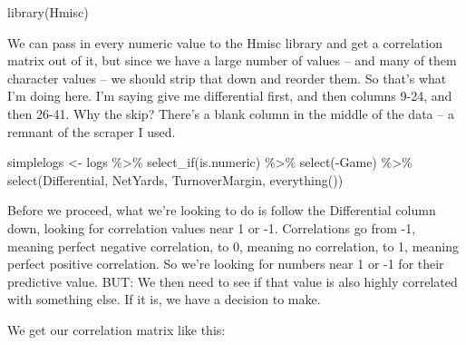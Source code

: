 \documentclass[
]{book}
\newenvironment{Shaded}{\begin{snugshade}}{\end{snugshade}}
\newcommand{\FunctionTok}[1]{\textcolor[rgb]{0.00,0.00,0.00}{#1}}
\newcommand{\NormalTok}[1]{#1}
\newcommand{\OtherTok}[1]{\textcolor[rgb]{0.56,0.35,0.01}{#1}}
\newcommand{\SpecialCharTok}[1]{\textcolor[rgb]{0.00,0.00,0.00}{#1}}
\begin{document}
\begin{Shaded}
\begin{Highlighting}[]
\FunctionTok{library}\NormalTok{(Hmisc)}
\end{Highlighting}
\end{Shaded}

We can pass in every numeric value to the Hmisc library and get a correlation matrix out of it, but since we have a large number of values -- and many of them character values -- we should strip that down and reorder them. So that's what I'm doing here. I'm saying give me differential first, and then columns 9-24, and then 26-41. Why the skip? There's a blank column in the middle of the data -- a remnant of the scraper I used.

\begin{Shaded}
\begin{Highlighting}[]
\NormalTok{simplelogs }\OtherTok{\textless{}{-}}\NormalTok{ logs }\SpecialCharTok{\%\textgreater{}\%} \FunctionTok{select\_if}\NormalTok{(is.numeric) }\SpecialCharTok{\%\textgreater{}\%} \FunctionTok{select}\NormalTok{(}\SpecialCharTok{{-}}\NormalTok{Game) }\SpecialCharTok{\%\textgreater{}\%} \FunctionTok{select}\NormalTok{(Differential, NetYards, TurnoverMargin, }\FunctionTok{everything}\NormalTok{())}
\end{Highlighting}
\end{Shaded}

Before we proceed, what we're looking to do is follow the Differential column down, looking for correlation values near 1 or -1. Correlations go from -1, meaning perfect negative correlation, to 0, meaning no correlation, to 1, meaning perfect positive correlation. So we're looking for numbers near 1 or -1 for their predictive value. BUT: We then need to see if that value is also highly correlated with something else. If it is, we have a decision to make.

We get our correlation matrix like this:

\begin{Shaded}
\end{Shaded}
\end{document}
